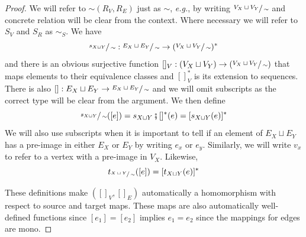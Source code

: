 \begin{proof}
	We will refer to $\sim (R_{V},R_{E})$ just as $\sim$, \textit{e.g.}, by writing $\sfrac{V_{X} \sqcup  V_{Y}}{\sim}$ and concrete relation will be clear from the context.
	Where necessary we will refer to $S_{V}$ and $S_{R}$ as $\sim_{S}$.
	We have
	\[
		\sfrac{s_{X\sqcup Y}}{\sim} : \sfrac{E_{X} \sqcup  E_{Y}}{\sim} \to (\sfrac{V_{X} \sqcup  V_{Y}}{\sim})^{*}
	\]
	and there is an obvious surjective function $[]_{V} : (V_{X} \sqcup  V_{Y}) \to (\sfrac{V_{X} \sqcup  V_{Y}}{\sim})$ that maps elements to their equivalence classes and $[]_{V}^{*}$ is its extension to sequences.
	There is also $[] : E_{X} \sqcup  E_{Y} \to \sfrac{E_{X} \sqcup  E_{Y}}{\sim}$ and we will omit subscripts as the correct type will be clear from the argument.
	We then define
	\[
		\sfrac{s_{X\sqcup Y}}{\sim}([e]) = s_{X\sqcup Y} \fatsemi []^{*}(e) = [s_{X\sqcup Y}(e)]^{*}
	\]
	We will also use subscripts when it is important to tell if an element of $E_{X} \sqcup  E_{Y}$ has a pre-image in either $E_{X}$ or $E_{Y}$ by writing $e_{x}$ or $e_{y}$.
	Similarly, we will write $v_{x}$ to refer to a vertex with a pre-image in $V_{X}$.
	Likewise,
	\[
		t_{\sfrac{X\sqcup Y}{\sim}}([e]) = [t_{X\sqcup Y}(e)]^{*}
	\]

	These definitions make $([]_{V},[]_{E})$ automatically a homomorphism with respect to source and target maps.
	These maps are also automatically well-defined functions since $[e_1] = [e_2]$ implies $e_1 = e_2$ since the mappings for edges are mono.


\end{proof}

